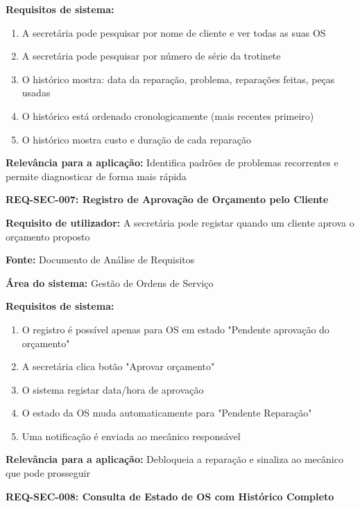 \documentclass[11pt,a4paper]{article}
\newcommand{\reqheader}[1]{{\noindent\large\bfseries\color{sectionblue}#1}\par\vspace{0.3cm}}
\newcommand{\reqfield}[2]{{\noindent\textbf{#1:} #2}\par\vspace{0.2cm}}
\begin{document}
\reqfield{Requisitos de sistema}{
	\begin{enumerate}
		\item A secretária pode pesquisar por nome de cliente e ver todas as suas OS
		\item A secretária pode pesquisar por número de série da trotinete
		\item O histórico mostra: data da reparação, problema, reparações feitas, peças usadas
		\item O histórico está ordenado cronologicamente (mais recentes primeiro)
		\item O histórico mostra custo e duração de cada reparação
	\end{enumerate}
}

\reqfield{Relevância para a aplicação}{Identifica padrões de problemas recorrentes e permite diagnosticar de forma mais rápida}

\vspace{0.8cm}

\reqheader{REQ-SEC-007: Registro de Aprovação de Orçamento pelo Cliente}

\reqfield{Requisito de utilizador}{A secretária pode registar quando um cliente aprova o orçamento proposto}

\reqfield{Fonte}{Documento de Análise de Requisitos}

\reqfield{Área do sistema}{Gestão de Ordens de Serviço}

\reqfield{Requisitos de sistema}{
	\begin{enumerate}
		\item O registro é possível apenas para OS em estado "Pendente aprovação do orçamento"
		\item A secretária clica botão "Aprovar orçamento"
		\item O sistema registar data/hora de aprovação
		\item O estado da OS muda automaticamente para "Pendente Reparação"
		\item Uma notificação é enviada ao mecânico responsável
	\end{enumerate}
}

\reqfield{Relevância para a aplicação}{Debloqueia a reparação e sinaliza ao mecânico que pode prosseguir}

\vspace{0.8cm}

\reqheader{REQ-SEC-008: Consulta de Estado de OS com Histórico Completo}
\end{document}

